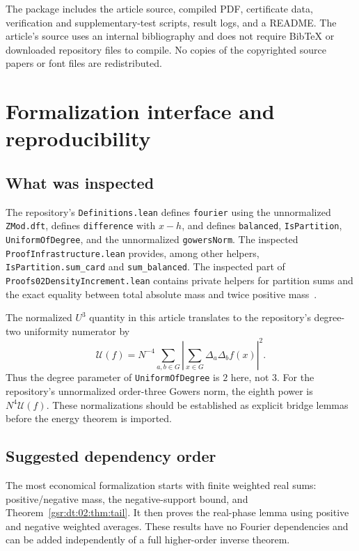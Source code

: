\documentclass[11pt,letterpaper]{article}
\numberwithin{equation}{section}
\theoremstyle{definition}
\theoremstyle{remark}
\newcommand{\1}{\mathbf 1}
\newcommand{\U}{\mathcal U}
\newcommand{\srctag}[1]{\texorpdfstring{\enspace\textup{[#1]}}{ [#1]}}
\newcommand{\srcnote}[2]{\par\noindent{\small\textit{Source #1, delivered #2.}}\par}
\begin{document}
The package includes the article source, compiled PDF, certificate data,
verification and supplementary-test scripts, result logs, and a README.
The article's source uses an internal bibliography and does not require
BibTeX or downloaded repository files to compile. No copies of the
copyrighted source papers or font files are redistributed.

\section[{Formalization interface and reproducibility\srctag{02}}]{Formalization interface and reproducibility}\label{gsr:fz:02:sec:d10}\label{gsr:fz:02:sec:formal}
\srcnote{02}{Section 10}

\subsection{What was inspected}
The repository's \texttt{Definitions.lean} defines \texttt{fourier} using the unnormalized \texttt{ZMod.dft}, defines \texttt{difference} with $x-h$, and defines \texttt{balanced}, \texttt{IsPartition}, \texttt{UniformOfDegree}, and the unnormalized \texttt{gowersNorm}. The inspected \texttt{ProofInfrastructure.lean} provides, among other helpers, \texttt{IsPartition.sum\_card} and \texttt{sum\_balanced}. The inspected part of \texttt{Proofs02DensityIncrement.lean} contains private helpers for partition sums and the exact equality between total absolute mass and twice positive mass~\cite{repo02}.

The normalized $U^3$ quantity in this article translates to the repository's degree-two uniformity numerator by
\[
 \U(f)=N^{-4}\sum_{a,b\in G}
          \left|\sum_{x\in G}\Delta_a\Delta_bf(x)\right|^2.
\]
Thus the degree parameter of \texttt{UniformOfDegree} is $2$ here, not $3$. For the repository's unnormalized order-three Gowers norm, the eighth power is $N^4\U(f)$. These normalizations should be established as explicit bridge lemmas before the energy theorem is imported.

\subsection{Suggested dependency order}
The most economical formalization starts with finite weighted real sums: positive/negative mass, the negative-support bound, and Theorem~\ref{gsr:dt:02:thm:tail}. It then proves the real-phase lemma using positive and negative weighted averages. These results have no Fourier dependencies and can be added independently of a full higher-order inverse theorem.
\end{document}
